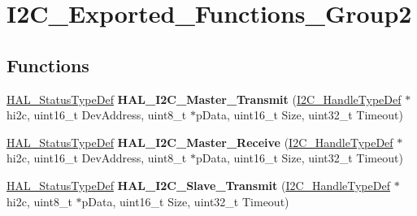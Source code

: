 \hypertarget{group___i2_c___exported___functions___group2}{}\section{I2\+C\+\_\+\+Exported\+\_\+\+Functions\+\_\+\+Group2}
\label{group___i2_c___exported___functions___group2}
\subsection*{Functions}
\begin{DoxyCompactItemize}
\item 
\mbox{\label{group___i2_c___exported___functions___group2_ga9440a306e25c7bd038cfa8619ec9a830}} 
\hyperlink{stm32f1xx__hal__def_8h_a63c0679d1cb8b8c684fbb0632743478f}{H\+A\+L\+\_\+\+Status\+Type\+Def} {\bfseries H\+A\+L\+\_\+\+I2\+C\+\_\+\+Master\+\_\+\+Transmit} (\hyperlink{struct_i2_c___handle_type_def}{I2\+C\+\_\+\+Handle\+Type\+Def} $\ast$hi2c, uint16\+\_\+t Dev\+Address, uint8\+\_\+t $\ast$p\+Data, uint16\+\_\+t Size, uint32\+\_\+t Timeout)
\item 
\mbox{\label{group___i2_c___exported___functions___group2_ga6b3cef8c309e88ed6d3b8deba149aac9}} 
\hyperlink{stm32f1xx__hal__def_8h_a63c0679d1cb8b8c684fbb0632743478f}{H\+A\+L\+\_\+\+Status\+Type\+Def} {\bfseries H\+A\+L\+\_\+\+I2\+C\+\_\+\+Master\+\_\+\+Receive} (\hyperlink{struct_i2_c___handle_type_def}{I2\+C\+\_\+\+Handle\+Type\+Def} $\ast$hi2c, uint16\+\_\+t Dev\+Address, uint8\+\_\+t $\ast$p\+Data, uint16\+\_\+t Size, uint32\+\_\+t Timeout)
\item 
\mbox{\label{group___i2_c___exported___functions___group2_ga9128c5f01406d0da061a2bce00b6866e}} 
\hyperlink{stm32f1xx__hal__def_8h_a63c0679d1cb8b8c684fbb0632743478f}{H\+A\+L\+\_\+\+Status\+Type\+Def} {\bfseries H\+A\+L\+\_\+\+I2\+C\+\_\+\+Slave\+\_\+\+Transmit} (\hyperlink{struct_i2_c___handle_type_def}{I2\+C\+\_\+\+Handle\+Type\+Def} $\ast$hi2c, uint8\+\_\+t $\ast$p\+Data, uint16\+\_\+t Size, uint32\+\_\+t Timeout)
\item 
\mbox{\label{group___i2_c___exported___functions___group2_ga92b445a5ca4f5b8195f1c10ebdc41687}} 

\end{DoxyCompactItemize}
